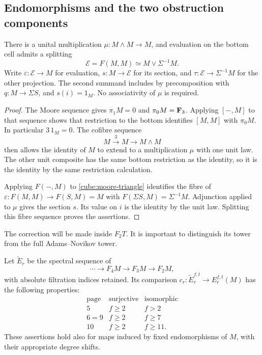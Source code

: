 \subsection{Endomorphisms and the two obstruction components}

\begin{lemma}\label{cube:endomorphisms}
There is a unital multiplication \(\mu:M\wedge M\to M\),
and evaluation on the bottom cell admits a splitting
\begin{equation}\label{cube:end-splitting}
 \mathcal E=F(M,M)\simeq M\vee\Sigma^{-1}M.
\end{equation}
Write \(\varepsilon:\mathcal E\to M\) for evaluation,
\(s:M\to\mathcal E\) for its section, and
\(\tau:\mathcal E\to\Sigma^{-1}M\) for the other projection.
The second summand includes by precomposition with
\(q:M\to\Sigma S\), and \(s(i)=1_M\).
No associativity of \(\mu\) is required.
\end{lemma}

\begin{proof}
The Moore sequence gives \(\pi_1M=0\) and
\(\pi_0M=\mathbf F_3\).  Applying \([-,M]\) to that sequence
shows that restriction to the bottom identifies
\([M,M]\) with \(\pi_0M\).  In particular \(3\,1_M=0\).
The cofibre sequence
\[
 M\xrightarrow{3}M\longrightarrow M\wedge M
\]
then allows the identity of \(M\) to extend to a
multiplication \(\mu\) with one unit law.  The other
unit composite has the same bottom restriction as
the identity, so it is the identity by the same
restriction calculation.

Applying \(F(-,M)\) to \eqref{cube:moore-triangle}
identifies the fibre of
\(\varepsilon:F(M,M)\to F(S,M)=M\) with
\(F(\Sigma S,M)=\Sigma^{-1}M\).
Adjunction applied to \(\mu\) gives the section \(s\).
Its value on \(i\) is the identity by the unit law.
Splitting this fibre sequence proves the assertions.
\end{proof}

The correction will be made inside \(F_2T\).  It is
important to distinguish its tower from the full
Adams--Novikov tower.

\begin{lemma}\label{cube:relative-tower}
Let \(\widetilde E_r\) be the spectral sequence of
\[
 \cdots\longrightarrow F_4M\longrightarrow F_3M
       \longrightarrow F_2M,
\]
with absolute filtration indices retained.  Its
comparison \(c_r:\widetilde E_r^{f,t}\to E_r^{f,t}(M)\)
has the following properties:
\[
\begin{array}{c|c|c}
\text{page}&\text{surjective}&\text{isomorphic}\\ \hline
5&f\geq2&f>2\\
6=9&f\geq2&f\geq7\\
10&f\geq2&f\geq11.
\end{array}
\]
These assertions hold also for maps induced by fixed
endomorphisms of \(M\), with their appropriate degree
shifts.
\end{lemma}

